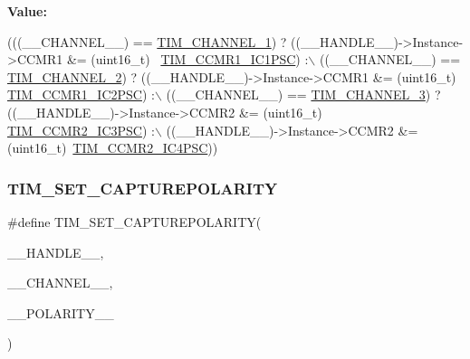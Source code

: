 {\bfseries Value\+:}
\begin{DoxyCode}
(((\_\_CHANNEL\_\_) == \hyperlink{group___t_i_m___channel_ga6b1541e4a49d62610899e24bf23f4879}{TIM\_CHANNEL\_1}) ? ((\_\_HANDLE\_\_)->Instance->CCMR1 &= (uint16\_t)~
      \hyperlink{group___peripheral___registers___bits___definition_gab46b7186665f5308cd2ca52acfb63e72}{TIM\_CCMR1\_IC1PSC}) :\(\backslash\)
 ((\_\_CHANNEL\_\_) == \hyperlink{group___t_i_m___channel_ga33e02d43345a7ac5886f01b39e4f7ccd}{TIM\_CHANNEL\_2}) ? ((\_\_HANDLE\_\_)->Instance->CCMR1 &= (uint16\_t)~
      \hyperlink{group___peripheral___registers___bits___definition_ga5e8e704f9ce5742f45e15e3b3126aa9d}{TIM\_CCMR1\_IC2PSC}) :\(\backslash\)
 ((\_\_CHANNEL\_\_) == \hyperlink{group___t_i_m___channel_ga4ea100c1789b178f3cb46721b7257e2d}{TIM\_CHANNEL\_3}) ? ((\_\_HANDLE\_\_)->Instance->CCMR2 &= (uint16\_t)~
      \hyperlink{group___peripheral___registers___bits___definition_gafc3d11f2e968752bc9ec7131c986c3a6}{TIM\_CCMR2\_IC3PSC}) :\(\backslash\)
 ((\_\_HANDLE\_\_)->Instance->CCMR2 &= (uint16\_t)~\hyperlink{group___peripheral___registers___bits___definition_ga6fd7591e2de10272f7fafb08cdd1b7b0}{TIM\_CCMR2\_IC4PSC}))
\end{DoxyCode}
\mbox{\label{group___t_i_m___private___macros_ga4321d7371ca3a8c18f96e925667a7b2f}} 
\subsubsection{\texorpdfstring{T\+I\+M\+\_\+\+S\+E\+T\+\_\+\+C\+A\+P\+T\+U\+R\+E\+P\+O\+L\+A\+R\+I\+TY}{TIM\_SET\_CAPTUREPOLARITY}}
{\footnotesize\ttfamily \#define T\+I\+M\+\_\+\+S\+E\+T\+\_\+\+C\+A\+P\+T\+U\+R\+E\+P\+O\+L\+A\+R\+I\+TY(\begin{DoxyParamCaption}\item[{}]{\+\_\+\+\_\+\+H\+A\+N\+D\+L\+E\+\_\+\+\_\+,  }\item[{}]{\+\_\+\+\_\+\+C\+H\+A\+N\+N\+E\+L\+\_\+\+\_\+,  }\item[{}]{\+\_\+\+\_\+\+P\+O\+L\+A\+R\+I\+T\+Y\+\_\+\+\_\+ }\end{DoxyParamCaption})}

